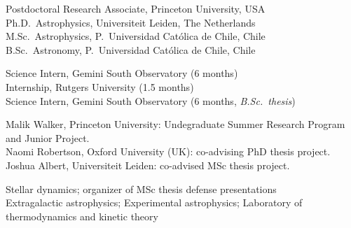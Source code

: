 \documentclass[11pt]{article}
\begin{document}

\noindent
{} Postdoctoral Research Associate, Princeton University, USA\\
 Ph.D.~Astrophysics, Universiteit Leiden, The Netherlands\\
 M.Sc.~Astrophysics, P.~Universidad Cat\'olica de Chile, Chile\\
 B.Sc.~Astronomy, P.~Universidad Cat\'olica de Chile, Chile



\noindent
{} Science Intern, Gemini South Observatory (6 months)\\
 Internship, Rutgers University (1.5 months)\\
 Science Intern, Gemini South Observatory (6 months, \emph{B.Sc.\ thesis})\\




\noindent
{} Malik Walker, Princeton University: Undegraduate Summer Research Program and Junior Project.\\
 Naomi Robertson, Oxford University (UK): co-advising PhD thesis project.\\
 Joshua Albert, Universiteit Leiden: co-advised MSc thesis project. 


\noindent
{} Stellar dynamics; organizer of MSc thesis defense presentations\\
 Extragalactic astrophysics; Experimental astrophysics; Laboratory of thermodynamics and kinetic theory\\
\end{document}

